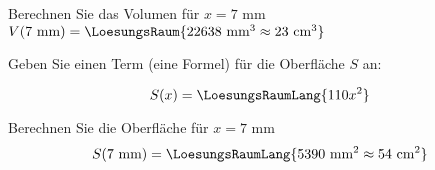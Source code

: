 \begin{bbwAufgabenBlock}
\item Berechnen Sie das Volumen für $x=7\textrm{ mm}$ $V(7 \textrm{
mm})  =  \LoesungsRaum{22638 \textrm{ mm}^3 \approx 23 \textrm{ cm}^3}$

\item Geben Sie einen Term (eine Formel) für die Oberfläche $S$ an:

$$S(x) = \LoesungsRaumLang{110x^2}$$

\item
Berechnen Sie die Oberfläche für $x=7 \textrm{ mm}$
$$S(7 \textrm{ mm}) = \LoesungsRaumLang{5390 \textrm{ mm}^2 \approx 54 \textrm{ cm}^2}$$
\end{bbwAufgabenBlock}
\platzFuerBerechnungenBisEndeSeite{}





